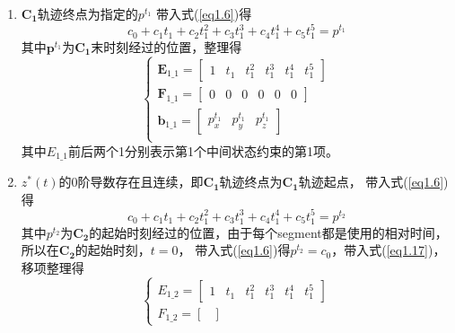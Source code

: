 \documentclass[40pt,a4paper,UTF8,twocolumn]{ctexart}%
\numberwithin{equation}{section}
\begin{document}
\begin{enumerate}
    \item $\bm{C_1}$轨迹终点为指定的$p^{t_1}$
    带入式(\ref{eq1.6})得
    \begin{equation}
        c_0+c_1t_1+c_2t_1^2+c_3t_1^3+c_4t_1^4+c_5t_1^5=p^{t_1}
    \end{equation}
    其中$\bm p^{t_1}$为$\bm{C_1}$末时刻经过的位置，整理得
    \begin{equation}
        \left\{
            \begin{array}{l}
                \bm E_{1\_1}=
                \begin{bmatrix}
                    1&t_1&t_1^2&t_1^3&t_1^4&t_1^5
                \end{bmatrix}\\
                \bm F_{1\_1}=
                \begin{bmatrix}
                    0&0&0&0&0&0
                \end{bmatrix}\\
                \bm b_{1\_1} = 
                \begin{bmatrix}
                    p^{t_1}_x & p^{t_1}_y & p^{t_1}_z
                \end{bmatrix}\\
            \end{array}
        \right.
        \label{eq1.6} %
    \end{equation}
    其中$E_{1\_1}$前后两个1分别表示第1个中间状态约束的第1项。
    \item $z^*(t)$的0阶导数存在且连续，即$\bm{C_1}$轨迹终点为$\bm{C_1}$轨迹起点，
    带入式(\ref{eq1.6})得
    \begin{equation}
        c_0+c_1t_1+c_2t_1^2+c_3t_1^3+c_4t_1^4+c_5t_1^5=p^{t_2}
        \label{eq1.17}
    \end{equation}
    其中$p^{t_2}$为$\bm{C_2}$的起始时刻经过的位置，由于每个segment都是使用的相对时间，所以在$\bm{C_2}$的起始时刻，$t=0$，
    带入式(\ref{eq1.6})得$p^{t_2}=c_0$，带入式(\ref{eq1.17})，移项整理得
        \begin{equation}
            \left\{
                \begin{array}{l}
                    E_{1\_2}=
                    \begin{bmatrix}
                        1&t_1&t_1^2&t_1^3&t_1^4&t_1^5
                    \end{bmatrix}\\
                    F_{1\_2}=
                    \begin{bmatrix}

\end{bmatrix}
\end{array}
\end{equation}
\end{enumerate}
\end{document}
